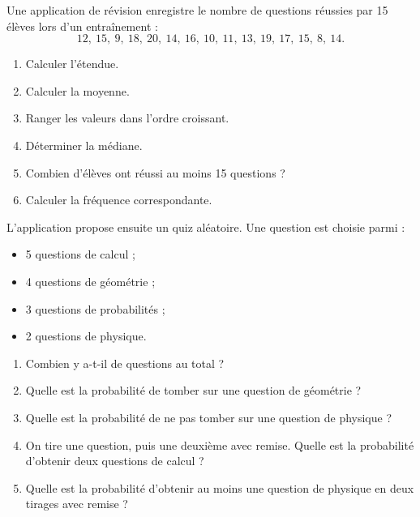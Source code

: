 \begin{exercice}
Une application de révision enregistre le nombre de questions réussies par 15 élèves lors d'un entraînement :
\[
12,\ 15,\ 9,\ 18,\ 20,\ 14,\ 16,\ 10,\ 11,\ 13,\ 19,\ 17,\ 15,\ 8,\ 14.
\]

\begin{enumerate}
  \item Calculer l'étendue.
  \item Calculer la moyenne.
  \item Ranger les valeurs dans l'ordre croissant.
  \item Déterminer la médiane.
  \item Combien d'élèves ont réussi au moins 15 questions ?
  \item Calculer la fréquence correspondante.
\end{enumerate}
\end{exercice}

\begin{exercice}
L'application propose ensuite un quiz aléatoire. Une question est choisie parmi :
\begin{itemize}
  \item 5 questions de calcul ;
  \item 4 questions de géométrie ;
  \item 3 questions de probabilités ;
  \item 2 questions de physique.
\end{itemize}

\begin{enumerate}
  \item Combien y a-t-il de questions au total ?
  \item Quelle est la probabilité de tomber sur une question de géométrie ?
  \item Quelle est la probabilité de ne pas tomber sur une question de physique ?
  \item On tire une question, puis une deuxième avec remise. Quelle est la probabilité d'obtenir deux questions de calcul ?
  \item Quelle est la probabilité d'obtenir au moins une question de physique en deux tirages avec remise ?
\end{enumerate}
\end{exercice}

